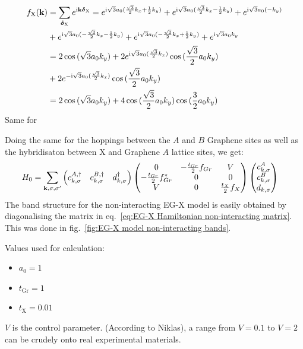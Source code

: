 \begin{align}
    f_{\mathrm{X}} (\bm{\mathrm{k}}) &= \sum_{\bm{\mathrm{\delta}}_{\mathrm{X}}} e^{\mathrm{i} \bm{\mathrm{k}} \bm{\mathrm{\delta}}_{\mathrm{X}}}
    = e^{\mathrm{i} \sqrt{3} a_0 (\frac{\sqrt{3}}{2} k_x + \frac{1}{2} k_y)}
    + e^{\mathrm{i} \sqrt{3} a_0 (\frac{\sqrt{3}}{2} k_x - \frac{1}{2} k_y)}
    + e^{\mathrm{i} \sqrt{3} a_0 (-k_y)} \\
    &+ e^{\mathrm{i} \sqrt{3} a_0 (-\frac{\sqrt{3}}{2} k_x - \frac{1}{2} k_y)}
    + e^{\mathrm{i} \sqrt{3} a_0 (-\frac{\sqrt{3}}{2} k_x + \frac{1}{2} k_y)}
    + e^{\mathrm{i} \sqrt{3} a_0 k_y} \\
    &= 2 \cos{(\sqrt{3} a_0 k_y)} + 2 e^{\mathrm{i} \sqrt{3} a_0 (\frac{\sqrt{3}}{2} k_x)} \cos{(\frac{\sqrt{3}}{2} a_0 k_y)} \\
    &+ 2 e^{-\mathrm{i} \sqrt{3} a_0 (\frac{\sqrt{3}}{2} k_x)} \cos{(\frac{\sqrt{3}}{2} a_0 k_y)} \\
    &= 2 \cos{(\sqrt{3} a_0 k_y)} + 4 \cos{(\frac{\sqrt{3}}{2} a_0 k_y)} \cos{(\frac{3}{2} a_0 k_y)}
\end{align}
Same for



Doing the same for the hoppings between the \(A\) and \(B\) Graphene sites as well as the hybridisaton between \(\mathrm{X}\) and Graphene \(A\) lattice sites, we get:
\begin{align}
    H_0 &= \sum_{\bm{\mathrm{k}}, \sigma, \sigma^{\prime}} \begin{pmatrix} c_{k, \sigma}^{A, \dagger} & c_{k, \sigma}^{B, \dagger} & d_{k, \sigma}^{\dagger} \end{pmatrix}
    \begin{pmatrix}
        0 & -\frac{t_{Gr}}{2} f_{Gr} & V \\
        -\frac{t_{Gr}}{2} f_{Gr}^* & 0 & 0 \\
        V & 0 & \frac{t_X}{2} f_{X}
    \end{pmatrix} \begin{pmatrix} c_{k, \sigma}^{A} \\ c_{k, \sigma}^{B} \\ d_{k, \sigma} \end{pmatrix}
    \label{eq:EG-X Hamiltonian non-interacting matrix}
\end{align}
The band structure for the non-interacting EG-X model is easily obtained by diagonalising the matrix in eq.~\ref{eq:EG-X Hamiltonian non-interacting matrix}.
This was done in fig.~\ref{fig:EG-X model non-interacting bands}.

Values used for calculation:
\begin{itemize}
    \item \(a_0 = 1\)
    \item \(t_{\mathrm{Gr}} = 1\)
    \item \(t_{\mathrm{X}} = 0.01\)
\end{itemize}
\(V\) is the control parameter.
(According to Niklas), a range from \(V = 0.1\) to \(V = 2\) can be crudely onto real experimental materials.

